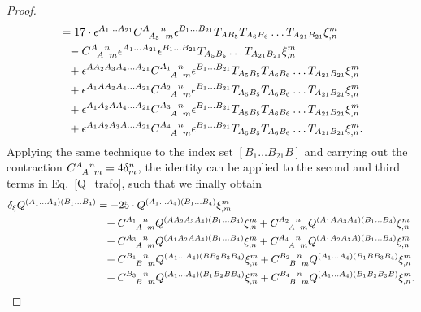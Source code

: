 \begin{proof}
\begin{equation}
\begin{aligned}
        &{} = 17 \cdot \epsilon^{A_1\dots A_{21}} \gmc{A}{A_5}{n}{m} \epsilon^{B_1\dots B_{21}} T_{AB_5}T_{A_6B_6}\dots T_{A_{21}B_{21}} \xi^m_{,n} \\
        &{} \hphantom{=} - \gmc{A}{A}{n}{m} \epsilon^{A_1\dots A_{21}}\epsilon^{B_1\dots B_{21}} T_{A_5B_5}\dots T_{A_{21}B_{21}} \xi^m_{,n} \\
        &{} \hphantom{=} + \epsilon^{AA_2A_3A_4\dots A_{21}} \gmc{A_1}{A}{n}{m} \epsilon^{B_1\dots B_{21}} T_{A_5B_5}T_{A_6B_6}\dots T_{A_{21}B_{21}} \xi^m_{,n} \\
        &{} \hphantom{=} + \epsilon^{A_1AA_3A_4\dots A_{21}} \gmc{A_2}{A}{n}{m} \epsilon^{B_1\dots B_{21}} T_{A_5B_5}T_{A_6B_6}\dots T_{A_{21}B_{21}} \xi^m_{,n} \\
        &{} \hphantom{=} + \epsilon^{A_1A_2AA_4\dots A_{21}} \gmc{A_3}{A}{n}{m} \epsilon^{B_1\dots B_{21}} T_{A_5B_5}T_{A_6B_6}\dots T_{A_{21}B_{21}} \xi^m_{,n} \\
        &{} \hphantom{=} + \epsilon^{A_1A_2A_3A\dots A_{21}} \gmc{A_4}{A}{n}{m} \epsilon^{B_1\dots B_{21}} T_{A_5B_5}T_{A_6B_6}\dots T_{A_{21}B_{21}} \xi^m_{,n}. \\
    \end{aligned}
  \end{equation}
  Applying the same technique to the index set $[B_1\dots B_{21} B]$ and carrying out the contraction $\gmc{A}{A}{n}{m} = 4\delta^{n}_{m}$, the identity can be applied to the second and third terms in Eq.~\ref{Q_trafo}, such that we finally obtain
  \begin{equation}
    \begin{aligned}
      \delta_\xi Q^{(A_1\dots A_4)(B_1\dots B_4)} &{} = -25 \cdot Q^{(A_1\dots A_4)(B_1\dots B_4)} \xi^m_{,m} \\
                                                  &{} \hphantom{=} + \gmc{A_1}{A}{n}{m} Q^{(AA_2A_3A_4)(B_1\dots B_4)} \xi^m_{,n} + \gmc{A_2}{A}{n}{m} Q^{(A_1AA_3A_4)(B_1\dots B_4)} \xi^m_{,n} \\
                                                  &{} \hphantom{=} + \gmc{A_3}{A}{n}{m} Q^{(A_1A_2AA_4)(B_1\dots B_4)} \xi^m_{,n} + \gmc{A_4}{A}{n}{m} Q^{(A_1A_2A_3A)(B_1\dots B_4)} \xi^m_{,n} \\
                                                  &{} \hphantom{=} + \gmc{B_1}{B}{n}{m} Q^{(A_1\dots A_4)(BB_2B_3B_4)} \xi^m_{,n} + \gmc{B_2}{B}{n}{m} Q^{(A_1\dots A_4)(B_1BB_3B_4)} \xi^m_{,n} \\
                                                  &{} \hphantom{=} + \gmc{B_3}{B}{n}{m} Q^{(A_1\dots A_4)(B_1B_2BB_4)} \xi^m_{,n} + \gmc{B_4}{B}{n}{m} Q^{(A_1\dots A_4)(B_1B_2B_3B)} \xi^m_{,n}.

\end{aligned}
\end{equation}
\end{proof}
